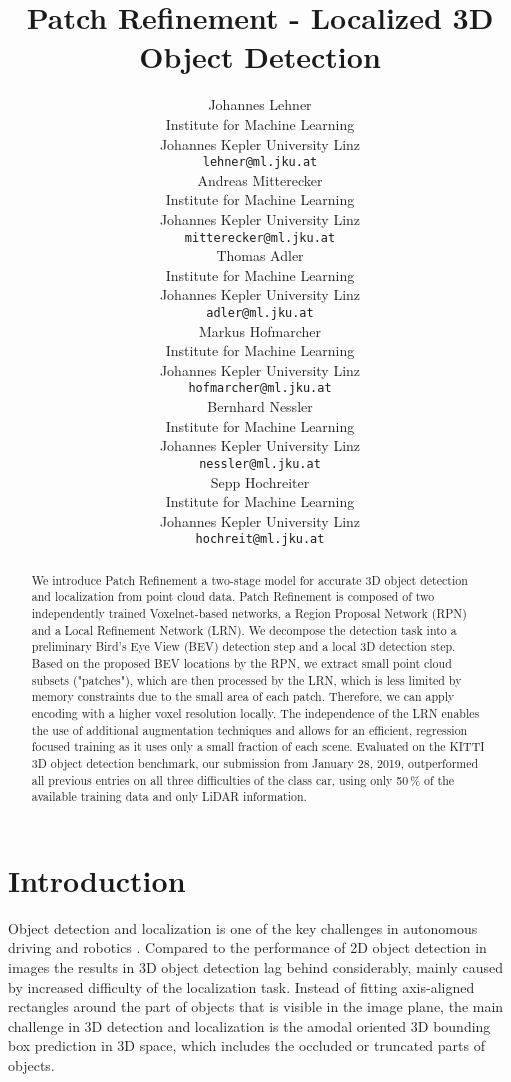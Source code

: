 \documentclass{article}
\title{Patch Refinement - Localized 3D Object Detection}
\author{Johannes Lehner \\ 
  Institute for Machine Learning\\
  Johannes Kepler University Linz\\
  \texttt{lehner@ml.jku.at} \\ 
  \And 
  Andreas Mitterecker \\
  Institute for Machine Learning\\
  Johannes Kepler University Linz\\
  \texttt{mitterecker@ml.jku.at} \\
  \And  
  Thomas Adler \\
  Institute for Machine Learning\\
  Johannes Kepler University Linz\\
  \texttt{adler@ml.jku.at} \\ 
  \And 
  Markus Hofmarcher \\
  Institute for Machine Learning\\
  Johannes Kepler University Linz\\
  \texttt{hofmarcher@ml.jku.at} \\
  \And
  Bernhard Nessler \\
  Institute for Machine Learning\\
  Johannes Kepler University Linz\\
  \texttt{nessler@ml.jku.at} \\
  \And
  Sepp Hochreiter \\
  Institute for Machine Learning\\
  Johannes Kepler University Linz\\
  \texttt{hochreit@ml.jku.at} \\
}
\begin{document}
\maketitle

\begin{abstract}
We introduce Patch Refinement a two-stage model for accurate 3D object detection and localization from point cloud data. Patch Refinement is composed of two independently trained Voxelnet-based networks, a Region Proposal Network (RPN) and a Local Refinement Network (LRN). We decompose the detection task into a preliminary Bird’s Eye View (BEV) detection step and a local 3D detection step. Based on the proposed BEV locations by the RPN, we extract small point cloud subsets ("patches"), which are then processed by the LRN, which is less limited by memory constraints due to the small area of each patch. Therefore, we can apply encoding with a higher voxel resolution locally. The independence of the LRN enables the use of additional augmentation techniques and allows for an efficient, regression focused training as it uses only a small fraction of each scene. 
Evaluated on the KITTI 3D object detection benchmark, our submission from January 28, 2019, outperformed all previous entries on all three difficulties of the class car, using only 50\,\% of the available training data and only LiDAR information.

\end{abstract}

\section{Introduction}
Object detection and localization is one of the key challenges in autonomous driving \cite{Geiger2012kitti} and robotics \cite{Wolf2016robotics}. Compared to the performance of 2D object detection in images the results in 3D object detection lag behind considerably, mainly caused by increased difficulty of the localization task. Instead of fitting axis-aligned rectangles around the part of objects that is visible in the image plane, the main challenge in 3D detection and localization is the amodal oriented 3D bounding box prediction in 3D space, which includes the occluded or truncated parts of objects.
\end{document}
